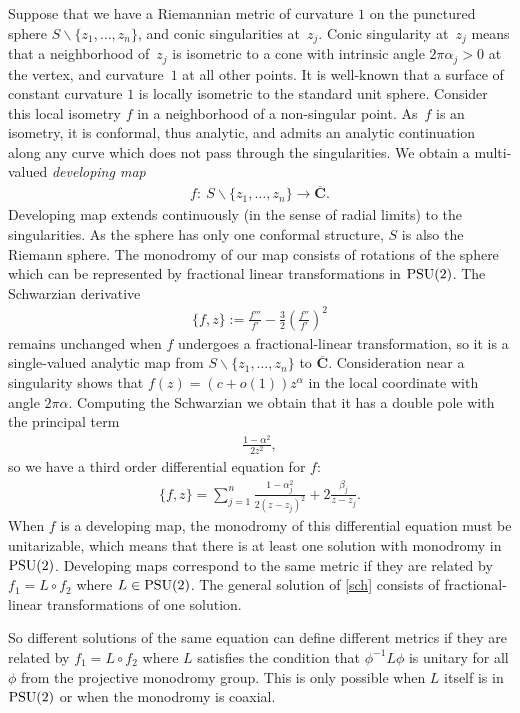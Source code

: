 \documentclass[pdftex]{sigma}
\numberwithin{equation}{section}
\def\bC{\mathbf{\overline{C}}}
\def\lc{,\allowbreak\ldots,\allowbreak}
\begin{document}
Suppose that we have a Riemannian metric of curvature $1$ on the punctured sphere $S\backslash\{ z_1\lc z_n\}$, and conic singularities at~$z_j$. Conic singularity at~$z_j$ means that a neighborhood of~$z_j$ is isometric to a cone with intrinsic angle $2\pi\alpha_j>0$ at the vertex, and curvature~$1$ at all other points. It is well-known that a surface of constant curvature $1$ is locally isometric to the standard unit sphere. Consider this local isometry $f$ in a neighborhood of a non-singular point. As~$f$ is an isometry, it is conformal, thus analytic, and admits an analytic continuation along any curve which does not pass through the singularities. We obtain a multi-valued {\em developing map}
\begin{gather*}
f\colon \ S\backslash\{ z_1\lc z_n\}\to\bC.
\end{gather*}
Developing map extends continuously (in the sense of radial limits) to the singularities. As the sphere has only one conformal structure, $S$ is also the Riemann sphere. The monodromy of our map consists of rotations of the sphere which can be represented by fractional linear transformations in ${\rm PSU}(2)$. The Schwarzian derivative
\begin{gather*}
\{ f,z\}:=\frac{f'''}{f'}-\frac{3}{2}\left(\frac{f''}{f'}\right)^2
\end{gather*}
remains unchanged when $f$ undergoes a fractional-linear transformation, so it is a single-valued analytic map from $S\backslash\{z_1\lc z_n\}$ to $\bC$. Consideration near a singularity shows that $f(z)=(c+o(1))z^\alpha$ in the local coordinate with angle $2\pi\alpha$. Computing the Schwarzian we obtain that it has a double pole with the principal term
\begin{gather*}
\frac{1-\alpha^2}{2z^2},
\end{gather*}
so we have a third order differential equation for $f$:
\begin{gather}\label{sch}
\{ f,z\}=\sum_{j=1}^n\frac{1-\alpha_j^2}{2(z-z_j)^2}+2\frac{\beta_j}{z-z_j}.
\end{gather}
When $f$ is a developing map, the monodromy of this differential equation must be unitarizable, which means that there is at least one solution with monodromy in ${\rm PSU}(2)$. Developing maps correspond to the
same metric if they are related by $f_1=L\circ f_2$ where $L\in {\rm PSU}(2)$. The general solution of \eqref{sch} consists of fractional-linear transformations of one solution.

So different solutions of the same equation can define different metrics if they are related by $f_1=L\circ f_2$ where $L$ satisfies the condition that $\phi^{-1}L\phi$ is unitary for all $\phi$ from the projective monodromy group. This is only possible when $L$ itself is in ${\rm PSU}(2)$ or when the monodromy is coaxial.
\end{document}

